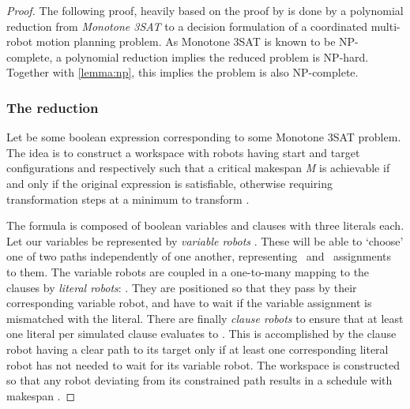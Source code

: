 \begin{proof}
	The following proof, heavily based on the proof by \cite{siamcomp/DemaineFKMS19} is done by a polynomial reduction from \emph{Monotone 3SAT} to a decision formulation of a coordinated multi-robot motion planning problem. As Monotone 3SAT is known to be NP-complete, a polynomial reduction implies the reduced problem is NP-hard. Together with \cref{lemma:np}, this implies the problem is also NP-complete. 

	\subsubsection*{The reduction} 
	Let \ilmath{\varphi} be some boolean expression corresponding to some Monotone 3SAT problem. The idea is to construct a workspace with robots having start and target configurations  and  respectively such that a critical makespan \emph{M} is achievable if and only if the original expression \ilmath{\varphi} is satisfiable, otherwise requiring  transformation steps at a minimum to transform . 


	The formula \ilmath{\varphi} is composed of  boolean variables  and  clauses  with three literals each. Let our variables be represented by  \emph{variable robots} . These will be able to `choose' one of two paths independently of one another, representing \true\ and \false\ assignments to them. The variable robots are coupled in a one-to-many mapping to the clauses by  \emph{literal robots}: . They are positioned so that they pass by their corresponding variable robot, and have to wait if the variable assignment is mismatched with the literal. There are finally  \emph{clause robots} to ensure that at least one literal per simulated clause evaluates to \true. This is accomplished by the clause robot having a clear path to its target only if at least one corresponding literal robot has not needed to wait for its variable robot. The workspace is constructed so that any robot deviating from its constrained path results in a schedule with makespan .


\end{proof}
